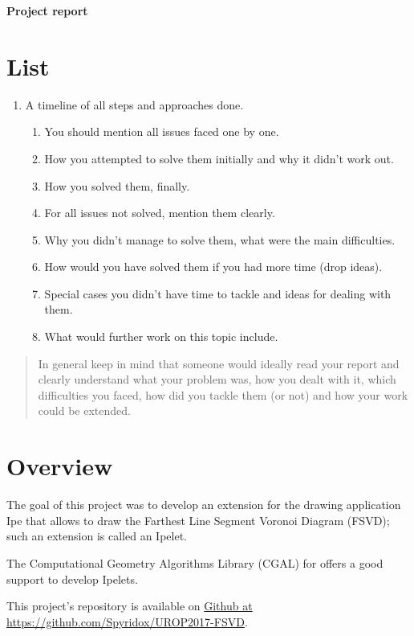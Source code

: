 \documentclass[11pt,a4paper,english]{article}
\begin{document}
    {\centering\huge\textbf{Project report}\par}

    \vspace{1cm}

	\section*{List}
	
	\begin{enumerate}
	\item A timeline of all steps and approaches done.
	\begin{enumerate}
	\item{You should mention all issues faced one by one.}
    \item{How you attempted to solve them initially and why it didn't work out.}
    \item{How you solved them, finally.}
    \item{For all issues not solved, mention them clearly.}
    \item{Why you didn't manage to solve them, what were the main difficulties.}
    \item{How would you have solved them if you had more time (drop ideas).}
    \item{Special cases you didn't have time to tackle and ideas for dealing with them.}
    \item{What would further work on this topic include.}
	\end{enumerate}
	\end{enumerate}
    
    \begin{quote}
	In general keep in mind that someone would ideally read your report and clearly understand what your problem was, how you dealt with it, which difficulties you faced, how did you tackle them (or not) and how your work could be extended.
    \end{quote}
    
    
    \newpage
    
    \section{Overview}
	
	The goal of this project was to develop an extension for the drawing application Ipe that allows to draw the Farthest Line Segment Voronoi Diagram (FSVD); such an extension is called an Ipelet.\par
	The Computational Geometry Algorithms Library (CGAL) for  offers a good support to develop Ipelets.\par
	This project's repository is available on \href{https://github.com/Spyridox/UROP2017-FSVD}{Github at https://github.com/Spyridox/UROP2017-FSVD}.
	
\end{document}

